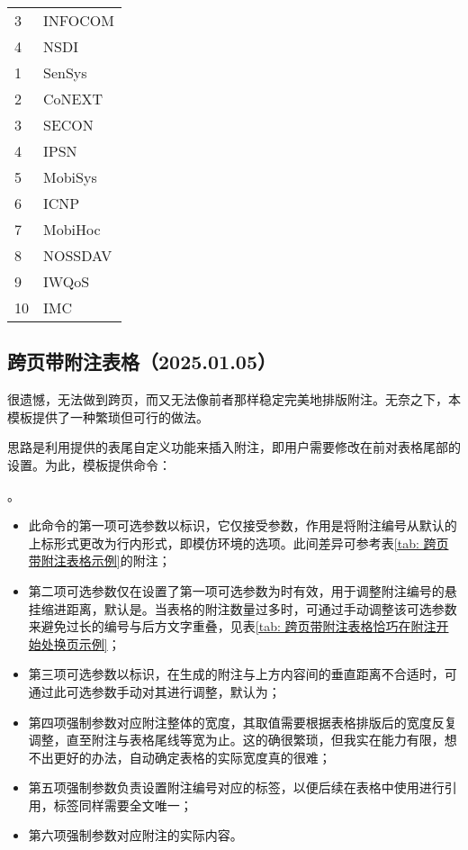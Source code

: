 \documentclass[doctor, vlined]{DissertUESTC}
\begin{document}
\begin{longtable}{p{2em} p{4.5em}}
		3 & INFOCOM \\
		4 & NSDI \\
		1 & SenSys \\
		2 & CoNEXT \\
		3 & SECON \\
		4 & IPSN \\
		5 & MobiSys \\
		6 & ICNP \\
		7 & MobiHoc \\
		8 & NOSSDAV \\
		9 & IWQoS \\
		10 & IMC \\
	\end{longtable}

	\clearpage
	\subsection{跨页带附注表格（2025.01.05）}

	很遗憾，无法做到跨页，而又无法像前者那样稳定完美地排版附注。无奈之下，本模板提供了一种繁琐但可行的做法。

	思路是利用提供的表尾自定义功能来插入附注，即用户需要修改在前对表格尾部的设置。为此，模板提供命令：
	
	。

	\begin{itemize}
		\item 此命令的第一项可选参数以\shad{()}标识，它仅接受参数，作用是将附注编号从默认的上标形式更改为行内形式，即模仿环境的选项。此间差异可参考表\ref{tab: 跨页带附注表格示例}的附注；
		\item 第二项可选参数仅在设置了第一项可选参数为时有效，用于调整附注编号的悬挂缩进距离，默认是\shad{1em}。当表格的附注数量过多时，可通过手动调整该可选参数来避免过长的编号与后方文字重叠，见表\ref{tab: 跨页带附注表格恰巧在附注开始处换页示例}；
		\item 第三项可选参数以\shad{[]}标识，在生成的附注与上方内容间的垂直距离不合适时，可通过此可选参数手动对其进行调整，默认为\shad{0bp}；
		\item 第四项强制参数对应附注整体的宽度，其取值需要根据表格排版后的宽度反复调整，直至附注与表格尾线等宽为止。这的确很繁琐，但我实在能力有限，想不出更好的办法，自动确定表格的实际宽度真的很难；
		\item 第五项强制参数负责设置附注编号对应的标签，以便后续在表格中使用进行引用，标签同样需要全文唯一；
		\item 第六项强制参数对应附注的实际内容。
	\end{itemize}
\end{document}
